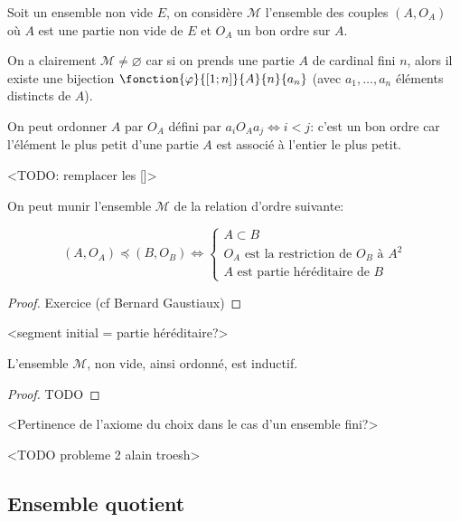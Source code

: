 \begin{proposition}{}{}
    Soit un ensemble non vide $E$, on considère $\mathcal{M}$ l'ensemble des couples $(A,O_A)$ où $A$ est une partie non vide de $E$ et $O_A$ un bon ordre sur $A$.
\end{proposition}

\begin{remark}{}{}
    On a clairement $\mathcal{M} \neq \varnothing$ car si on prends une partie $A$ de cardinal fini $n$, 
    alors il existe une bijection $\fonction{\varphi}{[1;n]}{A}{n}{a_n}$ (avec $a_1, \dots, a_n$ éléments distincts de $A$).

    On peut ordonner $A$ par $O_A$ défini par $a_i O_A a_j \Longleftrightarrow i < j$: c'est un bon ordre car l'élément le plus petit d'une partie $A$ est associé à l'entier le plus petit.
\end{remark}
<TODO: remplacer les []>

\begin{proposition}{}{}
    On peut munir l'ensemble $\mathcal{M}$ de la relation d'ordre suivante:

    \[ (A, O_A) \preccurlyeq (B, O_B) \Leftrightarrow \left\{
        \begin{array}{ll}
            A \subset B \\
            O_A \text{ est la restriction de } O_B \text{ à } A^2 \\
            A \text{ est partie héréditaire de } B
        \end{array}
    \right. \]

\end{proposition}

\begin{proof}
    Exercice (cf Bernard Gaustiaux)
\end{proof}

<segment initial = partie héréditaire?>

\begin{proposition}{}{}
    L'ensemble $\mathcal{M}$, non vide, ainsi ordonné, est inductif.
\end{proposition}

\begin{proof}
    TODO
\end{proof}


<Pertinence de l'axiome du choix dans le cas d'un ensemble fini?>

<TODO probleme 2 alain troesh>

\subsection{Ensemble quotient}

